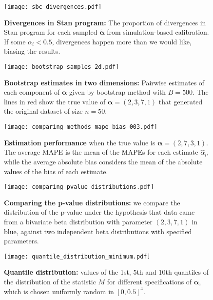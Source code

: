 \documentclass[a4paper, notitlepage, 10pt]{article}
\newcommand{\parameter}{\boldsymbol{\alpha}}
\theoremstyle{definition}
\begin{document}
\begin{figure}
    \centering
    \texttt{[image: sbc\_divergences.pdf]}
    \caption{{\bf Divergences in Stan program:} The proportion of divergences in Stan program for each sampled $\tilde{\parameter}$ from simulation-based calibration.
    If some $\alpha_i < 0.5$, divergences happen more than we would like, biasing the results.}\label{fig:sbc_divergences}
\end{figure}

\begin{figure}
    \centering
    \texttt{[image: bootstrap\_samples\_2d.pdf]}
    \caption{{\bf Bootstrap estimates in two dimensions:} Pairwise estimates of each component of $\parameter$ given by bootstrap method with $B=500$.
    The lines in red show the true value of $\parameter = (2,3,7,1)$ that generated the original dataset of size $n=50$.}\label{fig:bootstrap_samples_2d}
\end{figure}

\begin{figure}[!htbp]
    \centering
    \texttt{[image: comparing\_methods\_mape\_bias\_003.pdf]}
    \caption{{\bf Estimation performance} when the true value is $\boldsymbol{\alpha} = (2,7,3,1)$.
    The average MAPE is the mean of the MAPEs for each estimate $\hat\alpha_i$, while the average absolute bias considers the mean of the absolute values of the bias of each estimate.
    }\label{fig:comparing_methods_mape_bias003}
\end{figure}

\begin{figure}
    \centering
    \texttt{[image: comparing\_pvalue\_distributions.pdf]}
    \caption{{\bf Comparing the p-value distributions:} we compare the distribution of the p-value under the hypothesis that data came from a bivariate beta distribution with parameter $(2,3,7,1)$ in blue, against
    two independent beta distributions with specified parameters.}\label{fig:comparing_pvalue_distributions}
\end{figure}

\begin{figure}
    \centering
    \texttt{[image: quantile\_distribution\_minimum.pdf]}
    \caption{{\bf Quantile distribution:} values of the 1st, 5th and 10th quantiles of the distribution of the statistic $M$ for different specifications of $\parameter$, which is chosen uniformly random in ${[0,0.5]}^4$.}\label{fig:quantile_distribution_minimum}
\end{figure}
\end{document}
